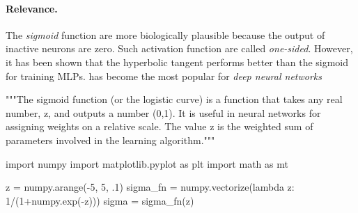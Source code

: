 \documentclass[%
oneside,                 %
final,                   %
10pt]{article}
\begin{document}
\paragraph{Relevance.}
The \emph{sigmoid} function are more biologically plausible because the
output of inactive neurons are zero. Such activation function are
called \emph{one-sided}. However, it has been shown that the hyperbolic
tangent performs better than the sigmoid for training MLPs.  has
become the most popular for \emph{deep neural networks}









































































\bpycod
"""The sigmoid function (or the logistic curve) is a 
function that takes any real number, z, and outputs a number (0,1).
It is useful in neural networks for assigning weights on a relative scale.
The value z is the weighted sum of parameters involved in the learning algorithm."""

import numpy
import matplotlib.pyplot as plt
import math as mt

z = numpy.arange(-5, 5, .1)
sigma_fn = numpy.vectorize(lambda z: 1/(1+numpy.exp(-z)))
sigma = sigma_fn(z)
\end{document}
